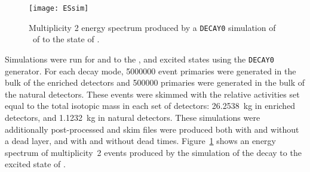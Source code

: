 \documentclass[/main.tex]{subfiles}
\begin{document}
\begin{figure}[h]
  \centering
  \texttt{[image: ESsim]}
  \caption[Simulation of multiplicty 2 events from \tnbb\ to ]{\label{fig:2dessim}
    Multiplicity 2 energy spectrum produced by a \texttt{DECAY0} simulation of \tnbb\ of  to the  state of .
  }
\end{figure}
Simulations were run for  \tnbb and \znbb to the  ,  and  excited states using the \texttt{DECAY0} generator.
For each decay mode, 5000000 event primaries were generated in the bulk of the enriched detectors and 500000 primaries were generated in the bulk of the natural detectors.
These events were skimmed with the relative activities set equal to the total isotopic mass in each set of detectors: 26.2538~kg in enriched detectors, and 1.1232~kg in natural detectors.
These simulations were additionally post-processed and skim files were produced both with and without a dead layer, and with and without dead times.
Figure~\ref{fig:2dessim} shows an energy spectrum of multiplicity~2 events produced by the simulation of the  decay to the  excited state of .
\end{document}

